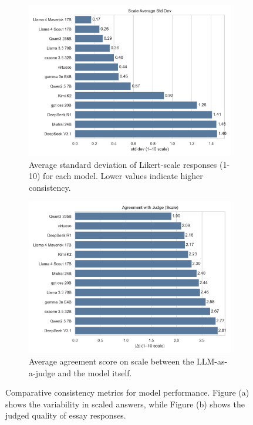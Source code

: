\documentclass[11pt]{article}
\begin{document}
\begin{figure}[htbp]
    \centering
    \begin{subfigure}[b]{0.495\textwidth}
        \centering
        \includegraphics[width=\textwidth]{A4_model_scale_avg_std.png}
        \caption{Average standard deviation of Likert-scale responses (1-10) for each model. Lower values indicate higher consistency.}
        \label{fig:model_scale_avg_std}
    \end{subfigure}
    \hfill
    \begin{subfigure}[b]{0.495\textwidth}
        \centering
        \includegraphics[width=\textwidth]{F1_best_models_judge_agreement.png}
        \caption{Average agreement score on scale between the LLM-as-a-judge and the model itself.}
        \label{fig:model_judge_avg_std}
    \end{subfigure}
    \caption{Comparative consistency metrics for model performance. Figure (a) shows the variability in scaled answers, while Figure (b) shows the judged quality of essay responses.}
    \label{fig:side_by_side_consistency}
\end{figure}
\end{document}
